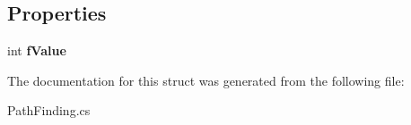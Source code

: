\subsection*{Properties}
\begin{DoxyCompactItemize}
\item 
\hypertarget{struct_pacman_1_1_path_finding_1_1_node_acea93c5cdc25fea4649cb0051db4f991}{int {\bfseries f\-Value}}\label{struct_pacman_1_1_path_finding_1_1_node_acea93c5cdc25fea4649cb0051db4f991}

\end{DoxyCompactItemize}


The documentation for this struct was generated from the following file\-:\begin{DoxyCompactItemize}
\item 
Path\-Finding.\-cs\end{DoxyCompactItemize}

